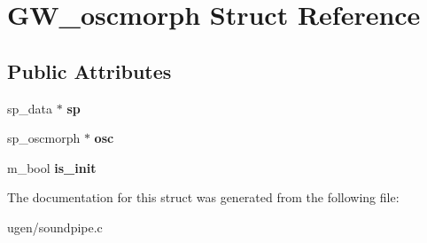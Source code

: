 \hypertarget{structGW__oscmorph}{}\section{G\+W\+\_\+oscmorph Struct Reference}
\label{structGW__oscmorph}
\subsection*{Public Attributes}
\begin{DoxyCompactItemize}
\item 
\hypertarget{structGW__oscmorph_a8b54d669db8631ee20792745e2d75b16}{}\label{structGW__oscmorph_a8b54d669db8631ee20792745e2d75b16} 
sp\+\_\+data $\ast$ {\bfseries sp}
\item 
\hypertarget{structGW__oscmorph_ad04ceaf4e7120d939db45b3b408dbfa6}{}\label{structGW__oscmorph_ad04ceaf4e7120d939db45b3b408dbfa6} 
sp\+\_\+oscmorph $\ast$ {\bfseries osc}
\item 
\hypertarget{structGW__oscmorph_a99d456002a83c08ecc7157fc272f50e4}{}\label{structGW__oscmorph_a99d456002a83c08ecc7157fc272f50e4} 
m\+\_\+bool {\bfseries is\+\_\+init}
\end{DoxyCompactItemize}


The documentation for this struct was generated from the following file\+:\begin{DoxyCompactItemize}
\item 
ugen/soundpipe.\+c\end{DoxyCompactItemize}
